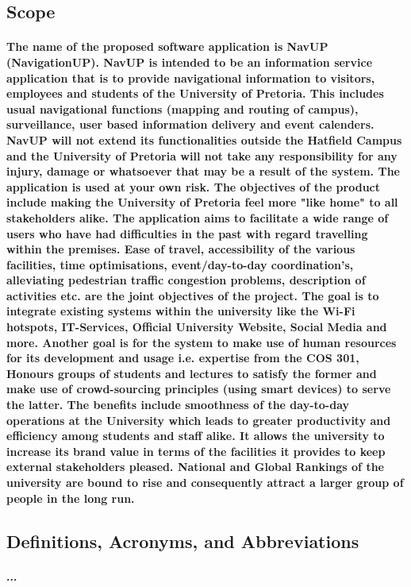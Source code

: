 \documentclass[runningheads,a4paper]{llncs}
\begin{document}
\subsection{Scope}
\paragraph*{The name of the proposed software application is NavUP (NavigationUP). NavUP is intended to be an information service application that is to provide navigational information to visitors, employees and students of the University of Pretoria. This includes usual navigational functions (mapping and routing of campus), surveillance, user based information delivery and event calenders. NavUP will not extend its functionalities outside the Hatfield Campus and the University of Pretoria will not take any responsibility for any injury, damage or whatsoever that may be a result of the system. The application is used at your own risk. The objectives of the product include making the University of Pretoria feel more "like home" to all stakeholders alike. The application aims to facilitate a wide range of users who have had difficulties in the past with regard travelling within the premises. Ease of travel, accessibility of the various facilities, time optimisations, event/day-to-day coordination's, alleviating pedestrian traffic congestion problems, description of activities etc. are the joint objectives of the project. The goal is to integrate existing systems within the university like the Wi-Fi hotspots, IT-Services, Official University Website, Social Media and more.  Another goal is for the system to make use of human resources for its development and usage i.e. expertise from the COS 301, Honours groups of students and lectures to satisfy the former and make use of crowd-sourcing principles (using smart devices) to serve the latter. The benefits include smoothness of the day-to-day operations at the University which leads to greater productivity and efficiency among students and staff alike. It allows the university to increase its brand value in terms of the facilities it provides to keep external stakeholders pleased. National and Global Rankings of the university are bound to rise and consequently attract a larger group of people in the long run.}
\subsection{Definitions, Acronyms, and Abbreviations}
\paragraph{...}
\end{document}
